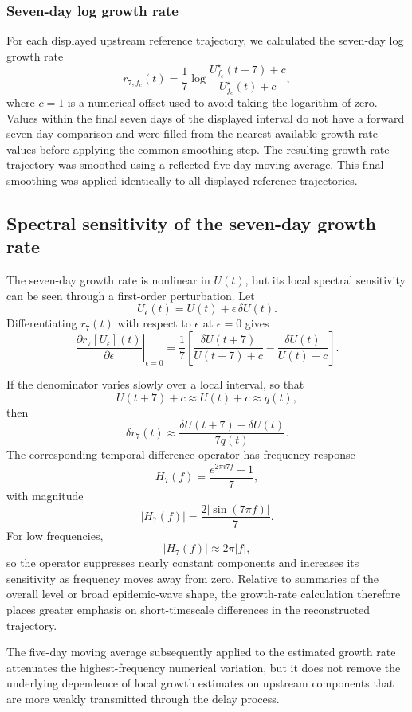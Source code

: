 \subsubsection{Seven-day log growth rate}
\label{sec:appendix_growth_rate}

For each displayed upstream reference trajectory, we calculated the seven-day
log growth rate
\[
r_{7,f_c}(t)
=
\frac{1}{7}
\log
\frac{
U^\star_{f_c}(t+7)+c
}{
U^\star_{f_c}(t)+c
},
\]
where \(c=1\) is a numerical offset used to avoid taking the logarithm of zero.
Values within the final seven days of the displayed interval do not have a
forward seven-day comparison and were filled from the nearest available growth-rate values before applying the common smoothing step. The resulting growth-rate trajectory was smoothed using a reflected five-day moving average. This final smoothing was applied identically to all displayed reference trajectories.


\subsection{Spectral sensitivity of the seven-day growth rate}
\label{sec:appendix_growth_spectral}

The seven-day growth rate is nonlinear in \(U(t)\), but its local spectral
sensitivity can be seen through a first-order perturbation. Let
\[
U_\epsilon(t)
=
U(t)+\epsilon\,\delta U(t).
\]
Differentiating \(r_7(t)\) with respect to \(\epsilon\) at \(\epsilon=0\)
gives
\[
\left.
\frac{\partial r_7[U_\epsilon](t)}
{\partial\epsilon}
\right|_{\epsilon=0}
=
\frac{1}{7}
\left[
\frac{\delta U(t+7)}
{U(t+7)+c}
-
\frac{\delta U(t)}
{U(t)+c}
\right].
\]

If the denominator varies slowly over a local interval, so that
\[
U(t+7)+c
\approx
U(t)+c
\approx
q(t),
\]
then
\[
\delta r_7(t)
\approx
\frac{
\delta U(t+7)-\delta U(t)
}{
7q(t)
}.
\]
The corresponding temporal-difference operator has frequency response
\[
H_7(f)
=
\frac{
e^{2\pi i 7f}-1
}{7},
\]
with magnitude
\[
|H_7(f)|
=
\frac{
2|\sin(7\pi f)|
}{7}.
\]
For low frequencies,
\[
|H_7(f)|
\approx
2\pi |f|,
\]
so the operator suppresses nearly constant components and increases its
sensitivity as frequency moves away from zero. Relative to summaries of the
overall level or broad epidemic-wave shape, the growth-rate calculation
therefore places greater emphasis on short-timescale differences in the
reconstructed trajectory.

The five-day moving average subsequently applied to the estimated growth rate
attenuates the highest-frequency numerical variation, but it does not remove
the underlying dependence of local growth estimates on upstream components
that are more weakly transmitted through the delay process.


